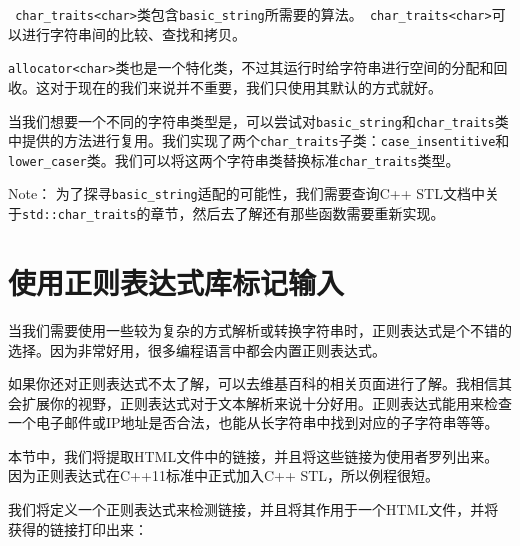\texttt{ char\_traits<char>}类包含\texttt{basic\_string}所需要的算法。\texttt{ char\_traits<char>}可以进行字符串间的比较、查找和拷贝。

\texttt{allocator<char>}类也是一个特化类，不过其运行时给字符串进行空间的分配和回收。这对于现在的我们来说并不重要，我们只使用其默认的方式就好。

当我们想要一个不同的字符串类型是，可以尝试对\texttt{basic\_string}和\texttt{char\_traits}类中提供的方法进行复用。我们实现了两个\texttt{char\_traits}子类：\texttt{case\_insentitive}和\texttt{lower\_caser}类。我们可以将这两个字符串类替换标准\texttt{char\_traits}类型。

\begin{myInfoBox}
Note： 为了探寻\texttt{basic\_string}适配的可能性，我们需要查询C++ STL文档中关于\texttt{std::char\_traits}的章节，然后去了解还有那些函数需要重新实现。
\end{myInfoBox}


\section{使用正则表达式库标记输入}

当我们需要使用一些较为复杂的方式解析或转换字符串时，正则表达式是个不错的选择。因为非常好用，很多编程语言中都会内置正则表达式。

如果你还对正则表达式不太了解，可以去维基百科的相关页面进行了解。我相信其会扩展你的视野，正则表达式对于文本解析来说十分好用。正则表达式能用来检查一个电子邮件或IP地址是否合法，也能从长字符串中找到对应的子字符串等等。

本节中，我们将提取HTML文件中的链接，并且将这些链接为使用者罗列出来。因为正则表达式在C++11标准中正式加入C++ STL，所以例程很短。


我们将定义一个正则表达式来检测链接，并且将其作用于一个HTML文件，并将获得的链接打印出来：

